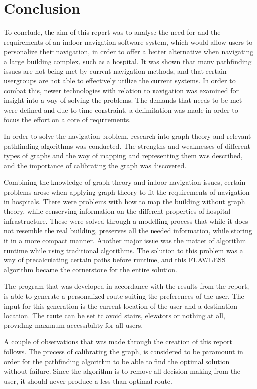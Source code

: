 \chapter{Conclusion}

To conclude, the aim of this report was to analyse the need for and the requirements of an indoor navigation software system, which would allow users to personalize their navigation, in order to offer a better alternative when navigating a large building complex, such as a hospital. It was shown that many pathfinding issues are not being met by current navigation methods, and that certain usergroups are not able to effectively utilize the current systems. In order to combat this, newer technologies with relation to navigation was examined for insight into a way of solving the problems. The demands that needs to be met were defined and due to time constraint, a delimitation was made in order to focus the effort on a core of requirements.

In order to solve the navigation problem, research into graph theory and relevant pathfinding algorithms was conducted. The strengths and weaknesses of different types of graphs and the way of mapping and representing them was described, and the importance of calibrating the graph was discovered. 

Combining the knowledge of graph theory and indoor navigation issues, certain problems arose when applying graph theory to fit the requirements of navigation in hospitals. There were problems with how to map the building without graph theory, while conserving information on the different properties of hospital infrastructure. These were solved through a modelling process that while it does not resemble the real building, preserves all the needed information, while storing it in a more compact manner. Another major issue was the matter of algorithm runtime while using traditional algorithms. The solution to this problem was a way of precalculating certain paths before runtime, and this FLAWLESS algorithm became the cornerstone for the entire solution.

The program that was developed in accordance with the results from the report, is able to generate a personalized route suiting the preferences of the user. The input for this generation is the current location of the user and a destination location. The route can be set to avoid stairs, elevators or nothing at all, providing maximum accessibility for all users.

A couple of observations that was made through the creation of this report follows. The process of calibrating the graph, is considered to be paramount in order for the pathfinding algorithm to be able to find the optimal solution without failure. Since the algorithm is to remove all decision making from the user, it should never produce a less than optimal route.